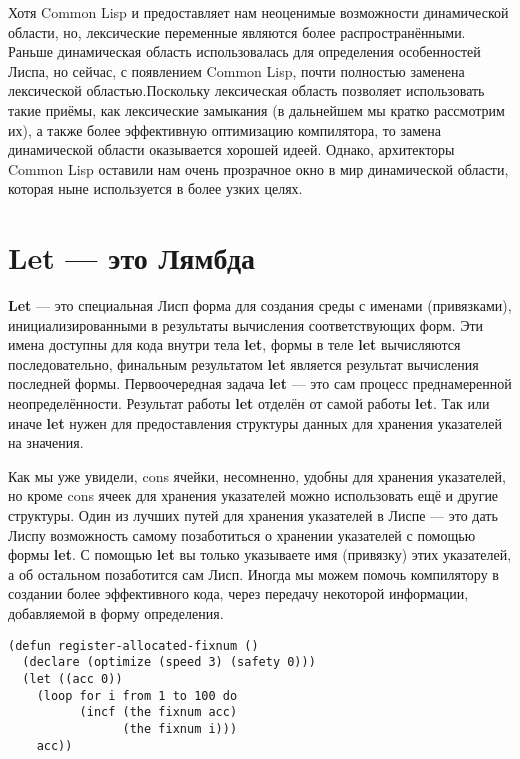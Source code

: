 Хотя Common Lisp и предоставляет нам неоценимые возможности динамической области, но, лексические переменные являются более распространёнными. Раньше динамическая область использовалась для определения особенностей Лиспа, но сейчас, с появлением Common Lisp, почти полностью заменена лексической областью.Поскольку лексическая область позволяет использовать такие приёмы, как лексические замыкания (в дальнейшем мы кратко рассмотрим их), а также более эффективную оптимизацию компилятора, то замена динамической области оказывается хорошей идеей. Однако, архитекторы Common Lisp оставили нам очень прозрачное окно в мир динамической области, которая ныне используется в более узких целях.

\section{Let --- это Лямбда}\label{section_let_it_be_lambda}

\textbf{Let} --- это специальная Лисп форма для создания среды с именами (привязками), инициализированными в результаты вычисления соответствующих форм. Эти имена доступны для кода внутри тела \textbf{let}, формы в теле \textbf{let} вычисляются последовательно, финальным результатом \textbf{let} является результат вычисления последней формы. Первоочередная задача \textbf{let} --- это сам процесс преднамеренной неопределённости. Результат работы \textbf{let} отделён от самой работы \textbf{let}. Так или иначе \textbf{let} нужен для предоставления структуры данных для хранения указателей на значения.

Как мы уже увидели, cons ячейки, несомненно, удобны для хранения указателей, но кроме cons ячеек для хранения указателей можно использовать ещё и другие структуры. Один из лучших путей для хранения указателей в Лиспе --- это дать Лиспу возможность самому позаботиться о хранении указателей с помощью формы \textbf{let}. С помощью \textbf{let} вы только указываете имя (привязку) этих указателей, а об остальном позаботится сам Лисп. Иногда мы можем помочь компилятору в создании более эффективного кода, через передачу некоторой информации, добавляемой в форму определения.

\begin{verbatim}
(defun register-allocated-fixnum ()
  (declare (optimize (speed 3) (safety 0)))
  (let ((acc 0))
    (loop for i from 1 to 100 do
          (incf (the fixnum acc)
                (the fixnum i)))
    acc))
\end{verbatim}

